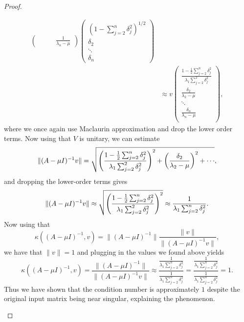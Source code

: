 \documentclass[12pt]{report}
\begin{document}
\begin{problem}
\begin{proof}
\begin{enumerate}
\begin{align*}
\begin{pmatrix}
            &&&\frac{1}{\lambda_n - \mu}
        \end{pmatrix} \begin{pmatrix}
            (1 - \sum_{j=2}^n \delta_j^2)^{1/2}\\
            \delta_2\\
            \ddots\\
            \delta_n
        \end{pmatrix}\\
        &\approx v \begin{pmatrix}
            \frac{1 - \frac{1}{2}\sum_{j=2}^n \delta_j^2}{\lambda_1 \sum_{j=2}^2 \delta_j^2}\\
            \frac{\delta_2}{\lambda_2 - \mu}\\
            \ddots\\
            \frac{\delta_n}{\lambda_n - \mu}\\
        \end{pmatrix},
    \end{align*}
    where we once again use Maclaurin approximation and drop the lower order terms. Now using that $V$ is unitary, we can estimate
    \begin{align*}
        \|(A - \mu I)^{-1}v\| = \sqrt{{\left(\frac{1 - \frac{1}{2}\sum_{j=2}^n \delta_j^2}{\lambda_1 \sum_{j=2}^2 \delta_j^2}\right)}^2 + {\left(\frac{\delta_2}{\lambda_2 - \mu}\right)}^2 + \cdots},
    \end{align*}
    and dropping the lower-order terms gives
    \[
        \|(A - \mu I)^{-1}v\| \approx \sqrt{{\left(\frac{1 - \frac{1}{2}\sum_{j=2}^n \delta_j^2}{\lambda_1 \sum_{j=2}^2 \delta_j^2}\right)}^2} \approx \frac{1}{\lambda_1 \sum_{j=2}^n \delta_j^2}.
    \]
    Now using that
    \[
         \kappa((A - \mu I)^{-1},v) = \|(A - \mu I)^{-1}\| \frac{\|v\|}{\|(A - \mu I)^{-1}v\|},
    \]
    we have that $\|v\| = 1$ and plugging in the values we found above yields
    \[
        \kappa((A - \mu I)^{-1},v) = \frac{\|(A - \mu I)^{-1}\|}{\|(A - \mu I)^{-1}v\|} \approx \frac{\frac{1}{\lambda_1 \sum_{j=2}^n \delta_j^2}}{\frac{1}{\lambda_1 \sum_{j=2}^n \delta_j^2}} = \frac{\frac{1}{\lambda_1 \sum_{j=2}^n \delta_j^2}}{\frac{1}{\lambda_1 \sum_{j=2}^n \delta_j^2}} = 1.
    \]
    Thus we have shown that the condition number is approximately $1$ despite the original input matrix being near singular, explaining the phenomenon. 





\end{enumerate}
\end{proof}
\end{problem}
\end{document}
